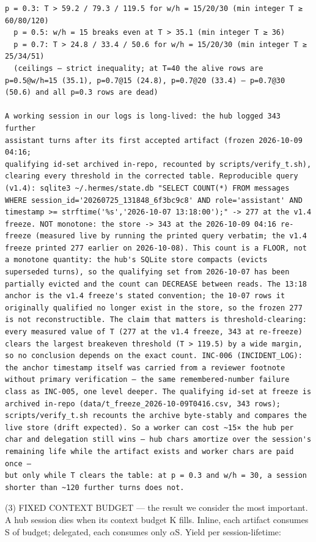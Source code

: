 \documentclass[
]{article}
\begin{document}
\begin{Verbatim}[breaklines,breakanywhere,fontsize=\small]
  p = 0.3: T > 59.2 / 79.3 / 119.5 for w/h = 15/20/30 (min integer T ≥ 60/80/120)
  p = 0.5: w/h = 15 breaks even at T > 35.1 (min integer T ≥ 36)
  p = 0.7: T > 24.8 / 33.4 / 50.6 for w/h = 15/20/30 (min integer T ≥ 25/34/51)
  (ceilings — strict inequality; at T=40 the alive rows are p=0.5@w/h=15 (35.1), p=0.7@15 (24.8), p=0.7@20 (33.4) — p=0.7@30 (50.6) and all p=0.3 rows are dead)

A working session in our logs is long-lived: the hub logged 343 further
assistant turns after its first accepted artifact (frozen 2026-10-09 04:16;
qualifying id-set archived in-repo, recounted by scripts/verify_t.sh),
clearing every threshold in the corrected table. Reproducible query (v1.4): sqlite3 ~/.hermes/state.db "SELECT COUNT(*) FROM messages WHERE session_id='20260725_131848_6f3bc9c8' AND role='assistant' AND timestamp >= strftime('%s','2026-10-07 13:18:00');" -> 277 at the v1.4 freeze. NOT monotone: the store -> 343 at the 2026-10-09 04:16 re-freeze (measured live by running the printed query verbatim; the v1.4 freeze printed 277 earlier on 2026-10-08). This count is a FLOOR, not a monotone quantity: the hub's SQLite store compacts (evicts superseded turns), so the qualifying set from 2026-10-07 has been partially evicted and the count can DECREASE between reads. The 13:18 anchor is the v1.4 freeze's stated convention; the 10-07 rows it originally qualified no longer exist in the store, so the frozen 277 is not reconstructible. The claim that matters is threshold-clearing: every measured value of T (277 at the v1.4 freeze, 343 at re-freeze) clears the largest breakeven threshold (T > 119.5) by a wide margin, so no conclusion depends on the exact count. INC-006 (INCIDENT_LOG): the anchor timestamp itself was carried from a reviewer footnote without primary verification — the same remembered-number failure class as INC-005, one level deeper. The qualifying id-set at freeze is archived in-repo (data/t_freeze_2026-10-09T0416.csv, 343 rows); scripts/verify_t.sh recounts the archive byte-stably and compares the live store (drift expected). So a worker can cost ~15× the hub per
char and delegation still wins — hub chars amortize over the session's
remaining life while the artifact exists and worker chars are paid once —
but only while T clears the table: at p = 0.3 and w/h = 30, a session
shorter than ~120 further turns does not.
\end{Verbatim}

(3) FIXED CONTEXT BUDGET --- the result we consider the most important.
A hub session dies when its context budget K fills. Inline, each
artifact consumes S of budget; delegated, each consumes only $\alpha$S. Yield
per session-lifetime:
\end{document}
